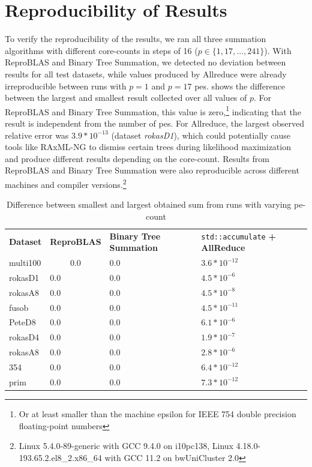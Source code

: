 \section{Reproducibility of Results}
\label{sec:VerificationOfReproducibility}
To verify the reproducibility of the results, we ran all three summation algorithms with different core-counts in steps of 16 ($p \in \{1, 17, \ldots, 241 \}$).
With ReproBLAS and Binary Tree Summation, we detected no deviation between results for all test datasets, while values produced by Allreduce were already  irreproducible between runs with $p=1$ and $p=17$ \glspl{pe}.
 shows the difference between the largest and smallest result collected over all values of $p$.
For ReproBLAS and Binary Tree Summation, this value is zero,\footnote{Or at least smaller than the machine epsilon for IEEE 754 double precision floating-point numbers} indicating that the result is independent from the number of \glspl{pe}.
For Allreduce, the largest observed relative error was $3.9 * 10^{-13}$ (dataset \textit{rokasD1}), which could potentially cause tools like RAxML-NG to dismiss certain trees during likelihood maximization and produce different results depending on the core-count.
Results from ReproBLAS and Binary Tree Summation were also reproducible across different machines and compiler versions.\footnote{Linux 5.4.0-89-generic with GCC 9.4.0 on i10pc138, Linux 4.18.0-193.65.2.el8\_2.x86\_64 with GCC 11.2 on bwUniCluster 2.0}

\begin{table}
\centering
\begin{tabular}{llll}
\textbf{Dataset} & \textbf{ReproBLAS }& \textbf{Binary Tree Summation} & \texttt{std::accumulate}\textbf{ + AllReduce} \\
multi100 & $$0.0$$ & $0.0$ & $3.6 * 10^{-12}$ \\
rokasD1 & $0.0$ & $0.0$ & $4.5 * 10^{-6}$ \\
rokasA8 & $0.0$ & $0.0$ & $4.5 * 10^{-8}$ \\
fusob & $0.0$ & $0.0$ & $4.5 * 10^{-11}$ \\
PeteD8 & $0.0$ & $0.0$ & $6.1 * 10^{-6}$ \\
rokasD4 & $0.0$ & $0.0$ & $1.9 * 10^{-7}$ \\
rokasA8 & $0.0$ & $0.0$ & $2.8 * 10^{-6}$ \\
354 & $0.0$ & $0.0$ & $6.4 * 10^{-12}$ \\
prim & $0.0$ & $0.0$ & $7.3 * 10^{-12}$
\end{tabular}
\caption{Difference between smallest and largest obtained sum from runs with varying \gls{pe}-count}
\label{table:runDeviation}
\end{table}

